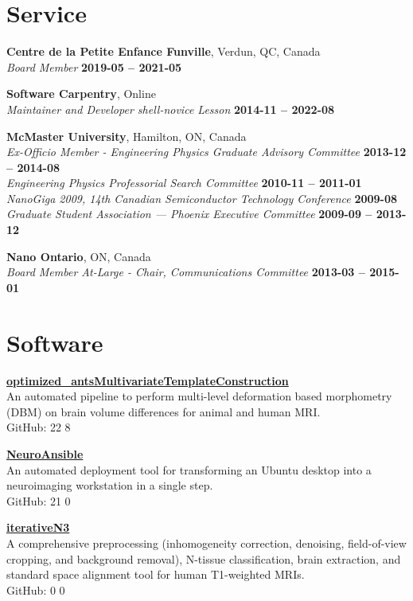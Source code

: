 \documentclass[margin1,line,canadian]{resume}
\begin{document}
\begin{resume}
\section{\mysidestyle{}Service}
\textbf{Centre de la Petite Enfance Funville}, Verdun, QC, Canada\\%
\textsl{Board Member} \hfill \textbf{2019-05 -- 2021-05}

\textbf{Software Carpentry}, Online\\%
\textsl{Maintainer and Developer shell-novice Lesson} \hfill \textbf{2014-11 -- 2022-08}

\textbf{McMaster University}, Hamilton, ON, Canada\\%
\textsl{Ex-Officio Member - Engineering Physics Graduate Advisory Committee} \hfill \textbf{2013-12 -- 2014-08}\\
\textsl{Engineering Physics Professorial Search Committee} \hfill \textbf{2010-11 -- 2011-01}\\
\textsl{NanoGiga 2009, 14th Canadian Semiconductor Technology Conference} \hfill \textbf{2009-08}\\
\textsl{Graduate Student Association --- Phoenix Executive Committee} \hfill \textbf{2009-09 -- 2013-12}

\textbf{Nano Ontario}, ON, Canada\\%
\textsl{Board Member At-Large - Chair, Communications Committee} \hfill \textbf{2013-03 -- 2015-01}

\section{\mysidestyle{}Software}
\textbf{\href{https://github.com/CoBrALab/optimized_antsMultivariateTemplateConstruction}{\color{black}optimized\_antsMultivariateTemplateConstruction}}\\%
An automated pipeline to perform multi-level deformation based morphometry (DBM) on brain volume differences for animal and human MRI.\\
GitHub: 22 \faStar{} 8 \faCodeFork

\textbf{\href{https://github.com/gdevenyi/NeuroAnsible}{\color{black}NeuroAnsible}}\\%
An automated deployment tool for transforming an Ubuntu desktop into a neuroimaging workstation in a single step.\\
GitHub: 21 \faStar{} 0 \faCodeFork

\textbf{\href{https://github.com/CoBrALab/iterativeN3}{\color{black}iterativeN3}}\\%
A comprehensive preprocessing (inhomogeneity correction, denoising, field-of-view cropping, and background removal), N-tissue
classification, brain extraction, and standard space alignment tool for human T1-weighted MRIs.\\
GitHub: 0 \faStar{} 0 \faCodeFork


\end{resume}
\end{document}
